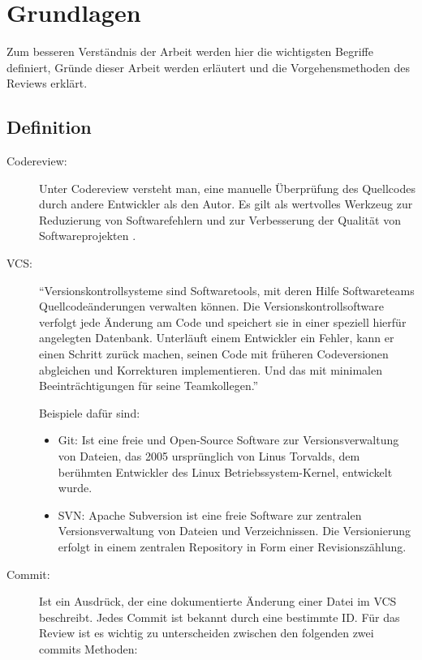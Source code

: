 \section{Grundlagen}
\label{sec:Grundlagen}

Zum besseren Verständnis der Arbeit werden hier die wichtigsten Begriffe definiert, Gründe dieser Arbeit werden erläutert und die Vorgehensmethoden des Reviews erklärt.

\subsection{Definition}
\label{subsec:Definition}

\begin{description}
	\item [Codereview:]
		Unter Codereview versteht man, eine manuelle Überprüfung des Quellcodes durch andere Entwickler als den Autor. Es gilt als wertvolles Werkzeug zur Reduzierung von 							Softwarefehlern und zur Verbesserung der Qualität von Softwareprojekten \cite{bacchelli2013expectations}.

	\item [\ac{VCS}:]
		"`Versionskontrollsysteme sind Softwaretools, mit deren Hilfe Softwareteams Quellcodeänderungen verwalten können. Die Versionskontrollsoftware verfolgt jede Änderung am Code und 		speichert sie in einer speziell hierfür angelegten Datenbank. Unterläuft einem Entwickler ein Fehler, kann er einen Schritt zurück machen, seinen Code mit früheren Codeversionen 		abgleichen und Korrekturen implementieren. Und das mit minimalen Beeinträchtigungen für seine Teamkollegen."' \cite{version-control-System}
		
		Beispiele dafür sind:
		\begin{itemize}
			\item Git: Ist eine freie und Open-Source Software zur Versionsverwaltung von Dateien, das 2005 ursprünglich von Linus Torvalds, dem berühmten Entwickler des Linux 						Betriebssystem-Kernel, entwickelt wurde.
			\item SVN: Apache Subversion ist eine freie Software zur zentralen Versionsverwaltung von Dateien und Verzeichnissen. Die Versionierung erfolgt in einem zentralen Repository 			in Form einer Revisionszählung.
		\end{itemize}
	
	\item[Commit:] Ist ein Ausdrück, der eine dokumentierte Änderung einer Datei im \ac{VCS} beschreibt. Jedes Commit ist bekannt durch eine bestimmte ID.
	Für das Review ist es wichtig zu unterscheiden zwischen den folgenden zwei commits Methoden:
	

\end{description}
